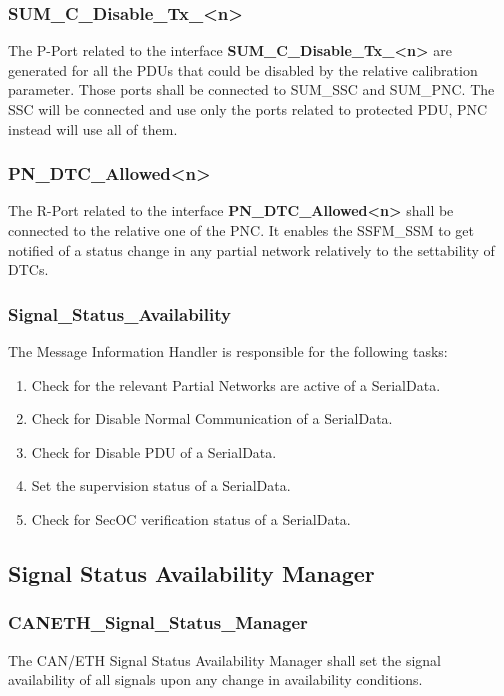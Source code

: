 \subsubsection{SUM\_C\_Disable\_Tx\_<n>}
The P-Port related to the interface \textbf{SUM\_C\_Disable\_Tx\_<n>} are generated for all the PDUs that could be disabled by the relative calibration parameter. Those ports shall be
connected to SUM\_SSC and SUM\_PNC. The SSC will be connected and use only the ports related to protected PDU, PNC instead will use all of them.

\subsubsection{PN\_DTC\_Allowed<n>}
\label{subsec:ssfmpndtcallowed}
The R-Port related to the interface \textbf{PN\_DTC\_Allowed<n>} shall be connected to the relative one of the PNC. It enables the SSFM\_SSM to get notified of a status
change in any partial network relatively to the settability of DTCs.

\subsubsection{Signal\_Status\_Availability}
\label{subsec:ssfmsigstatusavail}
The Message Information Handler is responsible for the following tasks:
\begin{enumerate}
    \item Check for the relevant Partial Networks are active of a SerialData.
    \item Check for Disable Normal Communication of a SerialData.
    \item Check for Disable PDU of a SerialData.
    \item Set the supervision status of a SerialData.
    \item Check for SecOC verification status of a SerialData.
\end{enumerate}

\subsection{Signal Status Availability Manager}
\label{subsec:ssfmsigstsmanager}
\subsubsection{CANETH\_Signal\_Status\_Manager}
The CAN/ETH Signal Status Availability Manager shall set the signal availability of all signals upon any change in availability conditions.

